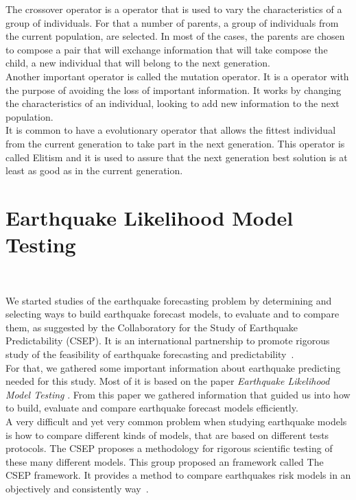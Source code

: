 The crossover operator is a operator that is used to vary the characteristics of a group of individuals. For that a number of parents, a group of individuals from the current population, are selected. In most of the cases, the parents are chosen to compose a pair that will exchange information that will take compose the child, a new individual that will belong to the next generation.\\

Another important operator is called the mutation operator. It is a operator with the purpose of avoiding the loss of important information. It works by changing the characteristics of an individual, looking to add new information to the next population.\\

It is common to have a evolutionary operator that allows the fittest individual from the current generation to take part in the next generation. This operator is called Elitism and it is used to assure that the next generation best solution is at least as good as in the current generation.\\


\section{Earthquake Likelihood Model Testing}~\label{testing}

We started studies of the earthquake forecasting problem by determining and selecting ways to build earthquake forecast models, to evaluate and to compare them, as suggested by the Collaboratory for the Study of Earthquake Predictability (CSEP). It is an international partnership to promote rigorous study of the feasibility of earthquake forecasting and predictability~\cite{ecta14}.\\

For that, we gathered some important information about earthquake predicting needed for this study. Most of it is based on the paper {\it Earthquake Likelihood Model Testing} \cite{schorlemmer2007earthquake}. From this paper we gathered information that guided us into how to build, evaluate and compare earthquake forecast models efficiently.\\

A very difficult and yet very common problem when studying earthquake models is how to compare different kinds of models, that are based on different tests protocols. The CSEP proposes a methodology for rigorous scientific testing of these many different models. This group proposed an framework called The CSEP framework. It provides a method to compare earthquakes risk models in an objectively and consistently way~\cite{ecta14}.\\

